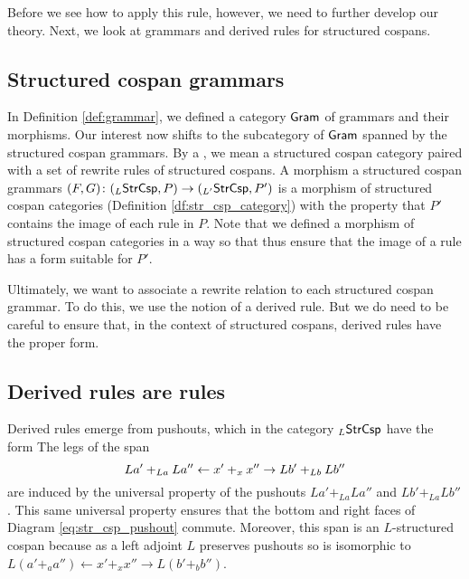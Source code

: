 \documentclass{amsart}
\begin{document}
Before we see how to apply this rule, however, we
need to further develop our theory. Next, we look
at grammars and derived rules for structured cospans.



\subsection{Structured cospan grammars}
\label{sec:struct-cosp-gramm}

In Definition \ref{def:grammar}, we defined a
category $ \mathsf{Gram} $ of grammars and their
morphisms.  Our interest now shifts to the
subcategory of $ \mathsf{Gram} $ spanned by the structured
cospan grammars. By a , we mean a structured cospan category
paired with a set of rewrite rules of structured
cospans.  A morphism a structured cospan grammars
$ (F,G) \colon ( _L\mathsf{StrCsp},P ) \to (_{L'}\mathsf{StrCsp},
P') $ is a morphism of structured cospan
categories (Definition \ref{df:str_csp_category})
with the property that $ P' $ contains the image
of each rule in $ P $. Note that we defined a
morphism of structured cospan categories in a way
so that 
thus ensure that the image of a rule has a form
suitable for $ P' $.

Ultimately, we want to associate a rewrite
relation to each structured cospan grammar. To do
this, we use the notion of a derived rule. But we
do need to be careful to ensure that, in the
context of structured cospans, derived rules have the
proper form.


\subsection{Derived rules are rules}
\label{sec:derived-rules-are}

Derived rules emerge from pushouts, which in the
category $_L\mathsf{StrCsp}$ have the form
 The legs of the
span
$$La'+_{La}La'' \leftarrow x'+_xx'' \to Lb'+_{Lb}Lb''$$
are induced by the universal property of the
pushouts $La'+_{La}La''$ and $Lb'+_{La}Lb''$. This
same universal property ensures that the bottom
and right faces of Diagram
\eqref{eq:str_csp_pushout} commute. Moreover, this
span is an $L$-structured cospan because as
a left adjoint $L$ preserves pushouts so is
isomorphic to
$ L(a'+_aa'') \gets x'+_xx'' \to L(b'+_bb'') $.
\end{document}
